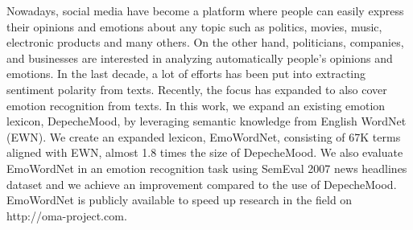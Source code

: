 Nowadays, social media have become a platform where people can easily express their opinions and emotions about any topic such as politics, movies, music, electronic products and many others. On the other hand, politicians, companies, and businesses are interested in analyzing automatically people's opinions and emotions. In the last decade, a lot of efforts has been put into extracting sentiment polarity from texts. Recently, the focus has expanded to also cover emotion recognition from texts. In this work, we expand an existing emotion lexicon, DepecheMood, by leveraging semantic knowledge from English WordNet (EWN). We create an expanded lexicon, EmoWordNet, consisting of 67K terms aligned with EWN, almost 1.8 times the size of DepecheMood. We also evaluate EmoWordNet in an emotion recognition task using SemEval 2007 news headlines dataset and we achieve an improvement compared to the use of DepecheMood. EmoWordNet is publicly available to speed up research in the field on http://oma-project.com.
